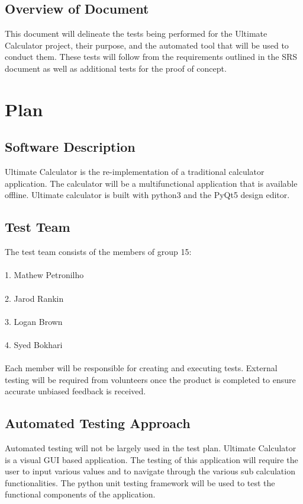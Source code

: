 \documentclass[12pt, titlepage]{article}
\begin{document}
\subsection{Overview of Document}

This document will delineate the tests being performed for the Ultimate Calculator project, their purpose, and the automated tool that will be used to conduct them. These tests will follow from the requirements outlined in the SRS document as well as additional tests for the proof of concept.

\section{Plan}
	
\subsection{Software Description}
Ultimate Calculator is the re-implementation of a traditional calculator application. The calculator will be a multifunctional application that is available offline. Ultimate calculator is built with python3 and the PyQt5 design editor.

\subsection{Test Team}
The test team consists of the members of group 15:
\\\\1. Mathew Petronilho
\\\\2. Jarod Rankin
\\\\3. Logan Brown
\\\\4. Syed Bokhari
\\\\Each member will be responsible for creating and executing tests. External testing will be required from volunteers once the product is completed to ensure accurate unbiased feedback is received. 

\subsection{Automated Testing Approach}
Automated testing will not be largely used in the test plan. Ultimate Calculator is a visual GUI based application. The testing of this application will require the user to input various values and to navigate through the various sub calculation functionalities. The python unit testing framework will be used to test the functional components of the application. 
\end{document}
